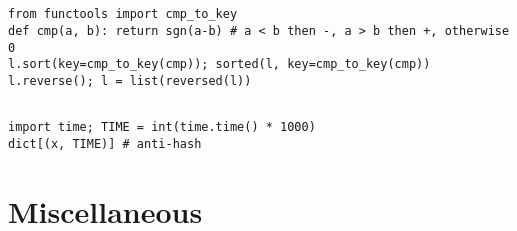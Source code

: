 \documentclass[landscape, 8pt, a4paper, oneside, twocolumn]{extarticle}
\begin{document}
\subsection{}
\begin{verbatim}
from functools import cmp_to_key
def cmp(a, b): return sgn(a-b) # a < b then -, a > b then +, otherwise 0
l.sort(key=cmp_to_key(cmp)); sorted(l, key=cmp_to_key(cmp))
l.reverse(); l = list(reversed(l))
\end{verbatim}
\subsection{}
\begin{verbatim}
import time; TIME = int(time.time() * 1000)
dict[(x, TIME)] # anti-hash
\end{verbatim}
\section{Miscellaneous}
\subsection{}
\subsection{}
\subsection{}

\end{document}
